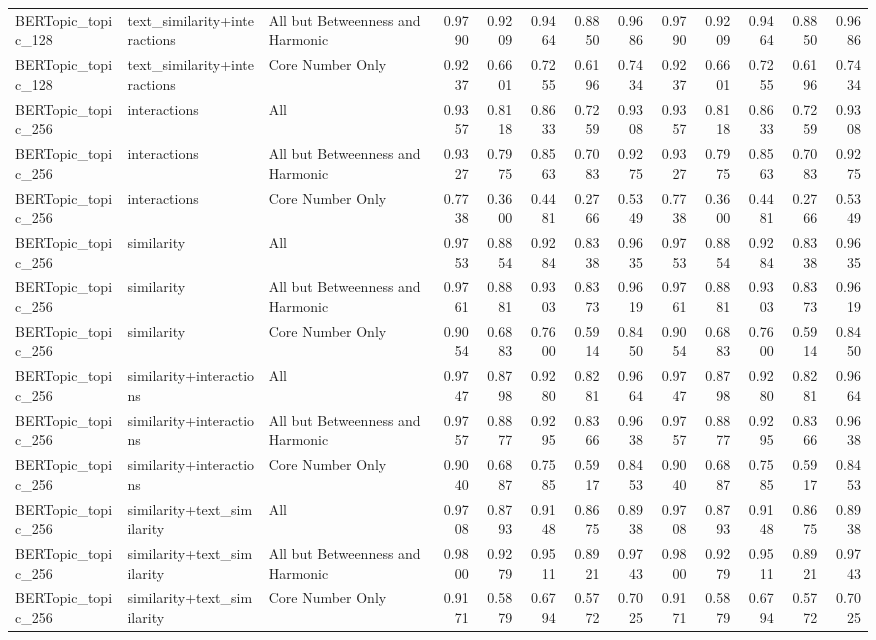 \begin{tabular}{lllrrrrrrrrrr}
BERTopic_topic_128 & text_similarity+interactions & All but Betweenness and Harmonic & 0.9790 & 0.9209 & 0.9464 & 0.8850 & 0.9686 & 0.9790 & 0.9209 & 0.9464 & 0.8850 & 0.9686 \\
BERTopic_topic_128 & text_similarity+interactions & Core Number Only & 0.9237 & 0.6601 & 0.7255 & 0.6196 & 0.7434 & 0.9237 & 0.6601 & 0.7255 & 0.6196 & 0.7434 \\
BERTopic_topic_256 & interactions & All & 0.9357 & 0.8118 & 0.8633 & 0.7259 & 0.9308 & 0.9357 & 0.8118 & 0.8633 & 0.7259 & 0.9308 \\
BERTopic_topic_256 & interactions & All but Betweenness and Harmonic & 0.9327 & 0.7975 & 0.8563 & 0.7083 & 0.9275 & 0.9327 & 0.7975 & 0.8563 & 0.7083 & 0.9275 \\
BERTopic_topic_256 & interactions & Core Number Only & 0.7738 & 0.3600 & 0.4481 & 0.2766 & 0.5349 & 0.7738 & 0.3600 & 0.4481 & 0.2766 & 0.5349 \\
BERTopic_topic_256 & similarity & All & 0.9753 & 0.8854 & 0.9284 & 0.8338 & 0.9635 & 0.9753 & 0.8854 & 0.9284 & 0.8338 & 0.9635 \\
BERTopic_topic_256 & similarity & All but Betweenness and Harmonic & 0.9761 & 0.8881 & 0.9303 & 0.8373 & 0.9619 & 0.9761 & 0.8881 & 0.9303 & 0.8373 & 0.9619 \\
BERTopic_topic_256 & similarity & Core Number Only & 0.9054 & 0.6883 & 0.7600 & 0.5914 & 0.8450 & 0.9054 & 0.6883 & 0.7600 & 0.5914 & 0.8450 \\
BERTopic_topic_256 & similarity+interactions & All & 0.9747 & 0.8798 & 0.9280 & 0.8281 & 0.9664 & 0.9747 & 0.8798 & 0.9280 & 0.8281 & 0.9664 \\
BERTopic_topic_256 & similarity+interactions & All but Betweenness and Harmonic & 0.9757 & 0.8877 & 0.9295 & 0.8366 & 0.9638 & 0.9757 & 0.8877 & 0.9295 & 0.8366 & 0.9638 \\
BERTopic_topic_256 & similarity+interactions & Core Number Only & 0.9040 & 0.6887 & 0.7585 & 0.5917 & 0.8453 & 0.9040 & 0.6887 & 0.7585 & 0.5917 & 0.8453 \\
BERTopic_topic_256 & similarity+text_similarity & All & 0.9708 & 0.8793 & 0.9148 & 0.8675 & 0.8938 & 0.9708 & 0.8793 & 0.9148 & 0.8675 & 0.8938 \\
BERTopic_topic_256 & similarity+text_similarity & All but Betweenness and Harmonic & 0.9800 & 0.9279 & 0.9511 & 0.8921 & 0.9743 & 0.9800 & 0.9279 & 0.9511 & 0.8921 & 0.9743 \\
BERTopic_topic_256 & similarity+text_similarity & Core Number Only & 0.9171 & 0.5879 & 0.6794 & 0.5772 & 0.7025 & 0.9171 & 0.5879 & 0.6794 & 0.5772 & 0.7025 \\

\end{tabular}
